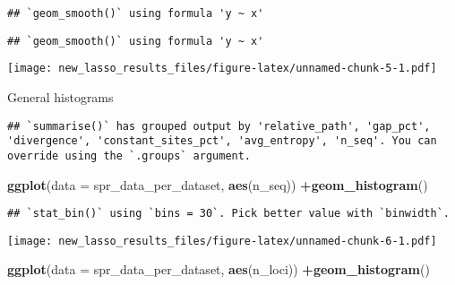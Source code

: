 \documentclass[
]{article}
\newenvironment{Shaded}{\begin{snugshade}}{\end{snugshade}}
\newcommand{\DataTypeTok}[1]{\textcolor[rgb]{0.13,0.29,0.53}{#1}}
\newcommand{\KeywordTok}[1]{\textcolor[rgb]{0.13,0.29,0.53}{\textbf{#1}}}
\newcommand{\NormalTok}[1]{#1}
\newcommand{\OperatorTok}[1]{\textcolor[rgb]{0.81,0.36,0.00}{\textbf{#1}}}
\newcommand{\StringTok}[1]{\textcolor[rgb]{0.31,0.60,0.02}{#1}}
\begin{document}
\begin{verbatim}
## `geom_smooth()` using formula 'y ~ x'
\end{verbatim}

\begin{verbatim}
## `geom_smooth()` using formula 'y ~ x'
\end{verbatim}

\texttt{[image: new\_lasso\_results\_files/figure-latex/unnamed-chunk-5-1.pdf]}

General histograms

\begin{Shaded}
\end{Shaded}

\begin{verbatim}
## `summarise()` has grouped output by 'relative_path', 'gap_pct', 'divergence', 'constant_sites_pct', 'avg_entropy', 'n_seq'. You can override using the `.groups` argument.
\end{verbatim}

\begin{Shaded}
\begin{Highlighting}[]
\KeywordTok{ggplot}\NormalTok{(}\DataTypeTok{data =}\NormalTok{ spr_data_per_dataset, }\KeywordTok{aes}\NormalTok{(n_seq)) }\OperatorTok{+}\KeywordTok{geom_histogram}\NormalTok{()}
\end{Highlighting}
\end{Shaded}

\begin{verbatim}
## `stat_bin()` using `bins = 30`. Pick better value with `binwidth`.
\end{verbatim}

\texttt{[image: new\_lasso\_results\_files/figure-latex/unnamed-chunk-6-1.pdf]}

\begin{Shaded}
\begin{Highlighting}[]
\KeywordTok{ggplot}\NormalTok{(}\DataTypeTok{data =}\NormalTok{ spr_data_per_dataset, }\KeywordTok{aes}\NormalTok{(n_loci)) }\OperatorTok{+}\KeywordTok{geom_histogram}\NormalTok{()}
\end{Highlighting}
\end{Shaded}
\end{document}
